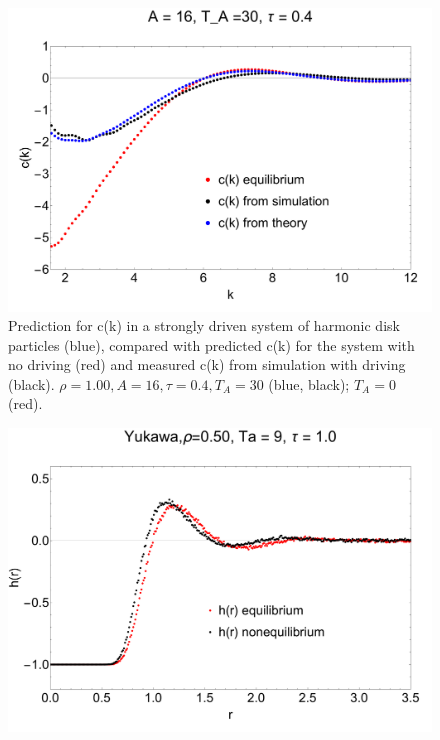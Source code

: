 \documentclass[amsmath,preprintnumbers,10pt,nofootinbib,prl,twocolumn]{revtex4-1}
\begin{document}
\begin{figure}
    \centering
    \includegraphics[scale=0.25, clip=True]{Ck_A16_T30_U0.4.pdf}
    \caption{Prediction for c(k) in a strongly driven system of harmonic disk particles (blue), compared with predicted c(k) for the system with no driving (red) and measured c(k) from simulation with driving (black). $\rho = 1.00, A = 16, \tau = 0.4, T_A = 30$ (blue, black); $T_A = 0$ (red).}
    \label{Fig:n}
\end{figure}

\begin{figure}
    \centering
    \includegraphics[scale=0.25, clip=True]{Yukawahr_Yp0.5_Pe3_U1.00.pdf}
    \caption{}
    \label{Fig:n}
\end{figure}
\end{document}
